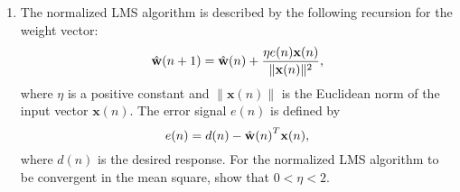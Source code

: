 \documentclass[10pt]{article}
\begin{document}
\begin{enumerate}
\vspace{2mm}
\item The normalized LMS algorithm is described by the following
recursion for the weight vector:
\begin{equation*}
\Hat{\mathbf{w}}(n+1)= \Hat{\mathbf{w}}(n) +\frac{\eta e(n)
\mathbf{x}(n)} {\| \mathbf{x}(n) \|^2},
\end{equation*}
where $\eta$ is a positive constant and $\|\mathbf{x}(n) \|$ is the
Euclidean norm of the input vector $\mathbf{x}(n)$. The error
signal $e(n)$ is defined by
\begin{equation*}
e(n)=d(n)-{\Hat{\mathbf{w}}(n)}^T \mathbf{x}(n),
\end{equation*}
where $d(n)$ is the desired response. For the normalized LMS algorithm to 
be convergent in the mean square, show that $0< \eta <2$. 



\end{enumerate}
\end{document}
